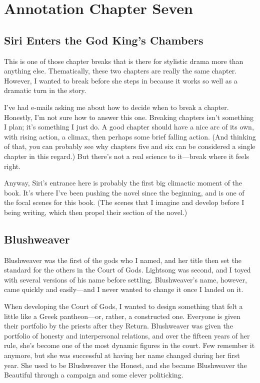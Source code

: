 \section{Annotation Chapter Seven}

\subsection*{Siri Enters the God King’s Chambers}

This is one of those chapter breaks that is there for stylistic drama more than anything else. Thematically, these two chapters are really the same chapter. However, I wanted to break before she steps in because it works so well as a dramatic turn in the story.

I’ve had e-mails asking me about how to decide when to break a chapter. Honestly, I’m not sure how to answer this one. Breaking chapters isn’t something I plan; it’s something I just do. A good chapter should have a nice arc of its own, with rising action, a climax, then perhaps some brief falling action. (And thinking of that, you can probably see why chapters five and six can be considered a single chapter in this regard.) But there’s not a real science to it—break where it feels right.

Anyway, Siri’s entrance here is probably the first big climactic moment of the book. It’s where I’ve been pushing the novel since the beginning, and is one of the focal scenes for this book. (The scenes that I imagine and develop before I being writing, which then propel their section of the novel.)

\subsection*{Blushweaver}

Blushweaver was the first of the gods who I named, and her title then set the standard for the others in the Court of Gods. Lightsong was second, and I toyed with several versions of his name before settling. Blushweaver’s name, however, came quickly and easily—and I never wanted to change it once I landed on it.

When developing the Court of Gods, I wanted to design something that felt a little like a Greek pantheon—or, rather, a constructed one. Everyone is given their portfolio by the priests after they Return. Blushweaver was given the portfolio of honesty and interpersonal relations, and over the fifteen years of her rule, she’s become one of the most dynamic figures in the court. Few remember it anymore, but she was successful at having her name changed during her first year. She used to be Blushweaver the Honest, and she became Blushweaver the Beautiful through a campaign and some clever politicking.


